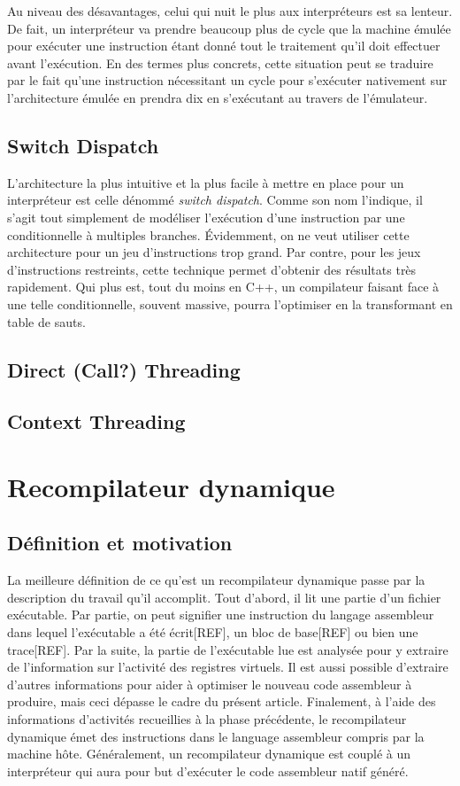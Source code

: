 \documentclass{article} %
\begin{document}
Au niveau des désavantages, celui qui nuit le plus aux interpréteurs est sa lenteur. De fait, un interpréteur va prendre beaucoup plus de cycle que la machine émulée pour exécuter une instruction étant donné tout le traitement qu'il doit effectuer avant l'exécution. En des termes plus concrets, cette situation peut se traduire par le fait qu'une instruction nécessitant un cycle pour s'exécuter nativement sur l'architecture émulée en prendra dix en s'exécutant au travers de l'émulateur.

\subsection{Switch Dispatch}
L'architecture la plus intuitive et la plus facile à mettre en place pour un interpréteur est celle dénommé \textit{switch dispatch}. Comme son nom l'indique, il s'agit tout simplement de modéliser l'exécution d'une instruction par une conditionnelle à multiples branches. Évidemment, on ne veut utiliser cette architecture pour un jeu d'instructions trop grand. Par contre, pour les jeux d'instructions restreints, cette technique permet d'obtenir des résultats très rapidement. Qui plus est, tout du moins en C++, un compilateur faisant face à une telle conditionnelle, souvent massive, pourra l'optimiser en la transformant en table de sauts.

\subsection{Direct (Call?) Threading}

\subsection{Context Threading}

\section{Recompilateur dynamique}
\subsection{Définition et motivation}
La meilleure définition de ce qu'est un recompilateur dynamique passe par la description du travail qu'il accomplit. Tout d'abord, il lit une partie d'un fichier exécutable. Par partie, on peut signifier une instruction du langage assembleur dans lequel l'exécutable a été écrit[REF], un bloc de base[REF] ou bien une trace[REF]. Par la suite, la partie de l'exécutable lue est analysée pour y extraire de l'information sur l'activité des registres virtuels. Il est aussi possible d'extraire d'autres informations pour aider à optimiser le nouveau code assembleur à produire, mais ceci dépasse le cadre du présent article. Finalement, à l'aide des informations d'activités recueillies à la phase précédente, le recompilateur dynamique émet des instructions dans le language assembleur compris par la machine hôte. Généralement, un recompilateur dynamique est couplé à un interpréteur qui aura pour but d'exécuter le code assembleur natif généré.
\end{document}
